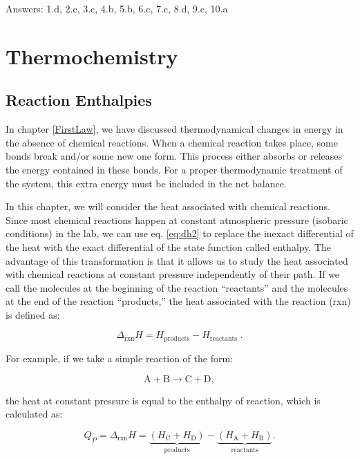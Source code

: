 \documentclass[
  9pt,
]{extbook}
\theoremstyle{definition}
\theoremstyle{definition}
\theoremstyle{definition}
\theoremstyle{remark}
\begin{document}
Answers: 1.d, 2.c, 3.c, 4.b, 5.b, 6.c, 7.c, 8.d, 9.c, 10.a

\newcommand*{\standardstate}{{-\kern-6pt{\ominus}\kern-6pt-}}

\hypertarget{Thermochemistry}{%
\chapter{Thermochemistry}\label{Thermochemistry}}

\hypertarget{rxnenthalpy}{%
\section{Reaction Enthalpies}\label{rxnenthalpy}}

In chapter \ref{FirstLaw}, we have discussed thermodynamical changes in energy in the absence of chemical reactions. When a chemical reaction takes place, some bonds break and/or some new one form. This process either absorbs or releases the energy contained in these bonds. For a proper thermodynamic treatment of the system, this extra energy must be included in the net balance.

In this chapter, we will consider the heat associated with chemical reactions. Since most chemical reactions happen at constant atmospheric pressure (isobaric conditions) in the lab, we can use eq. \eqref{eq:dh2} to replace the inexact differential of the heat with the exact differential of the state function called enthalpy. The advantage of this transformation is that it allows us to study the heat associated with chemical reactions at constant pressure independently of their path. If we call the molecules at the beginning of the reaction ``reactants'' and the molecules at the end of the reaction ``products,'' the heat associated with the reaction (rxn) is defined as:

\begin{equation}
  \Delta_{\text{rxn}} H = H_{\text{products}}-H_{\text{reactants}} \; .
  \label{eq:DHrxn1}
\end{equation}

For example, if we take a simple reaction of the form:

\[ \mathrm{A} + \mathrm{B} \rightarrow \mathrm{C} + \mathrm{D}, \]

the heat at constant pressure is equal to the enthalpy of reaction, which is calculated as:

\begin{equation}
  Q_P = \Delta_{\text{rxn}} H = \underbrace{ \left (H_{\mathrm{C}}+H_{\mathrm{D}} \right) }_{\text{products}} - \underbrace{\left( H_{\mathrm{A}}+H_{\mathrm{B}}\right)}_{\text{reactants}}.
  \label{eq:DHrxn2}
\end{equation}
\end{document}
